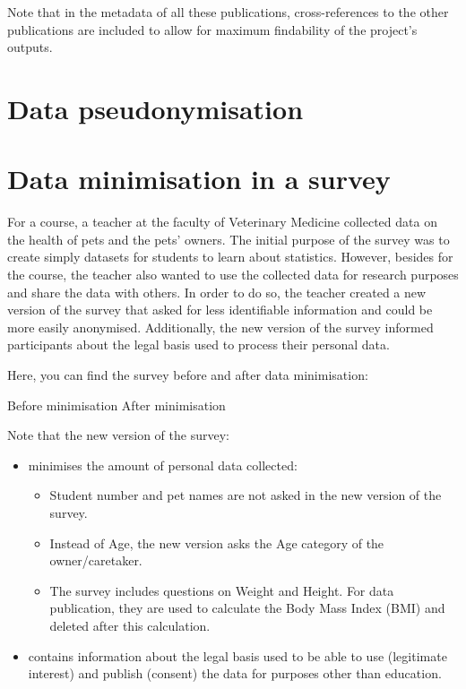 \documentclass[
]{book}
\providecommand{\tightlist}{%
  \setlength{\itemsep}{0pt}\setlength{\parskip}{0pt}}
\begin{document}
Note that in the metadata of all these publications, cross-references to the
other publications are included to allow for maximum findability of the
project's outputs.

\hypertarget{youth-pseudonymisation}{%
\chapter{Data pseudonymisation}\label{youth-pseudonymisation}}

\hypertarget{pet-survey}{%
\chapter{Data minimisation in a survey}\label{pet-survey}}

For a course, a teacher at the faculty of Veterinary Medicine collected data on
the health of pets and the pets' owners. The initial purpose of the survey was
to create simply datasets for students to learn about statistics. However,
besides for the course, the teacher also wanted to use the collected data for
research purposes and share the data with others. In order to do so, the teacher
created a new version of the survey that asked for less identifiable information
and could be more easily anonymised. Additionally, the new version of the survey
informed participants about the legal basis used to process their personal data.

Here, you can find the survey before and after data minimisation:

Before minimisation
After minimisation

Note that the new version of the survey:

\begin{itemize}
\tightlist
\item
  minimises the amount of personal data collected:

  \begin{itemize}
  \tightlist
  \item
    Student number and pet names are not asked in the new version of the survey.
  \item
    Instead of Age, the new version asks the Age category of the owner/caretaker.
  \item
    The survey includes questions on Weight and Height. For data publication,
    they are used to calculate the Body Mass Index (BMI) and deleted after this
    calculation.
  \end{itemize}
\item
  contains information about the legal basis used to be able to use (legitimate
  interest) and publish (consent) the data for purposes other than education.
\end{itemize}
\end{document}
